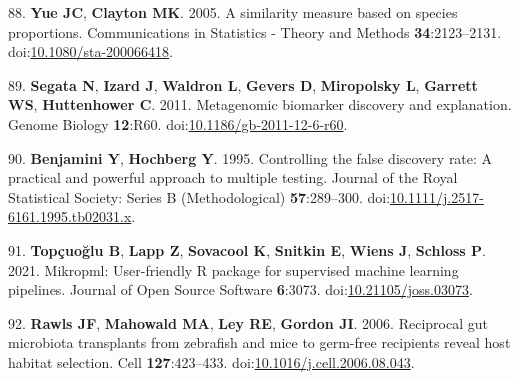 \documentclass[
  12pt,
]{article}
\newenvironment{cslreferences}%
  {}%
  {\par}
\begin{document}
\begin{cslreferences}
\leavevmode\hypertarget{ref-Yue2005}{}%
88. \textbf{Yue JC}, \textbf{Clayton MK}. 2005. A similarity measure
based on species proportions. Communications in Statistics - Theory and
Methods \textbf{34}:2123--2131.
doi:\href{https://doi.org/10.1080/sta-200066418}{10.1080/sta-200066418}.

\leavevmode\hypertarget{ref-Segata2011}{}%
89. \textbf{Segata N}, \textbf{Izard J}, \textbf{Waldron L},
\textbf{Gevers D}, \textbf{Miropolsky L}, \textbf{Garrett WS},
\textbf{Huttenhower C}. 2011. Metagenomic biomarker discovery and
explanation. Genome Biology \textbf{12}:R60.
doi:\href{https://doi.org/10.1186/gb-2011-12-6-r60}{10.1186/gb-2011-12-6-r60}.

\leavevmode\hypertarget{ref-Benjamini1995}{}%
90. \textbf{Benjamini Y}, \textbf{Hochberg Y}. 1995. Controlling the
false discovery rate: A practical and powerful approach to multiple
testing. Journal of the Royal Statistical Society: Series B
(Methodological) \textbf{57}:289--300.
doi:\href{https://doi.org/10.1111/j.2517-6161.1995.tb02031.x}{10.1111/j.2517-6161.1995.tb02031.x}.

\leavevmode\hypertarget{ref-Topcuoglu2021}{}%
91. \textbf{Topçuoğlu B}, \textbf{Lapp Z}, \textbf{Sovacool K},
\textbf{Snitkin E}, \textbf{Wiens J}, \textbf{Schloss P}. 2021.
Mikropml: User-friendly R package for supervised machine learning
pipelines. Journal of Open Source Software \textbf{6}:3073.
doi:\href{https://doi.org/10.21105/joss.03073}{10.21105/joss.03073}.

\leavevmode\hypertarget{ref-Rawls2006}{}%
92. \textbf{Rawls JF}, \textbf{Mahowald MA}, \textbf{Ley RE},
\textbf{Gordon JI}. 2006. Reciprocal gut microbiota transplants from
zebrafish and mice to germ-free recipients reveal host habitat
selection. Cell \textbf{127}:423--433.
doi:\href{https://doi.org/10.1016/j.cell.2006.08.043}{10.1016/j.cell.2006.08.043}.
\end{cslreferences}

\newpage
\end{document}
